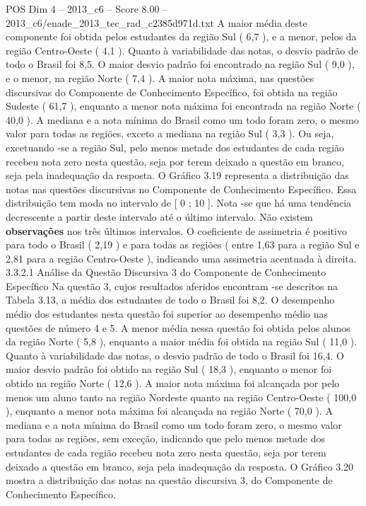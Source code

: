 \begin{textsample}{POS Dim 4 – 2013\_c6 – Score 8.00 – 2013\_c6/enade\_2013\_tec\_rad\_c2385d971d.txt}
A maior média deste componente foi obtida pelos estudantes da região Sul ( 6,7 ), e a menor, pelos da região Centro-Oeste ( 4,1 ).
Quanto à variabilidade das notas, o desvio padrão de todo o Brasil foi 8,5.
O maior desvio padrão foi encontrado na região Sul ( 9,0 ), e o menor, na região Norte ( 7,4 ).
A maior nota máxima, nas questões discursivas do Componente de Conhecimento Específico, foi obtida na região Sudeste ( 61,7 ), enquanto a menor nota máxima foi encontrada na região Norte ( 40,0 ).
A mediana e a nota mínima do Brasil como um todo foram zero, o mesmo valor para todas as regiões, exceto a mediana na região Sul ( 3,3 ).
Ou seja, excetuando -se a região Sul, pelo menos metade dos estudantes de cada região recebeu nota zero nesta questão, seja por terem deixado a questão em branco, seja pela inadequação da resposta.
O Gráfico 3.19 representa a distribuição das notas nas questões discursivas no Componente de Conhecimento Específico.
Essa distribuição tem moda no intervalo de [ 0 ; 10 ].
Nota -se que há uma tendência decrescente a partir deste intervalo até o último intervalo.
Não existem \textbf{observações} nos três últimos intervalos.
O coeficiente de assimetria é positivo para todo o Brasil ( 2,19 ) e para todas as regiões ( entre 1,63 para a região Sul e 2,81 para a região Centro-Oeste ), indicando uma assimetria acentuada à direita. 3.3.2.1 Análise da Questão Discursiva 3 do Componente de Conhecimento Específico Na questão 3, cujos resultados aferidos encontram -se descritos na Tabela 3.13, a média dos estudantes de todo o Brasil foi 8,2.
O desempenho médio dos estudantes nesta questão foi superior ao desempenho médio nas questões de número 4 e 5.
A menor média nessa questão foi obtida pelos alunos da região Norte ( 5,8 ), enquanto a maior média foi obtida na região Sul ( 11,0 ).
Quanto à variabilidade das notas, o desvio padrão de todo o Brasil foi 16,4.
O maior desvio padrão foi obtido na região Sul ( 18,3 ), enquanto o menor foi obtido na região Norte ( 12,6 ).
A maior nota máxima foi alcançada por pelo menos um aluno tanto na região Nordeste quanto na região Centro-Oeste ( 100,0 ), enquanto a menor nota máxima foi alcançada na região Norte ( 70,0 ).
A mediana e a nota mínima do Brasil como um todo foram zero, o mesmo valor para todas as regiões, sem exceção, indicando que pelo menos metade dos estudantes de cada região recebeu nota zero nesta questão, seja por terem deixado a questão em branco, seja pela inadequação da resposta.
O Gráfico 3.20 mostra a distribuição das notas na questão discursiva 3, do Componente de Conhecimento Específico.

\end{textsample}

